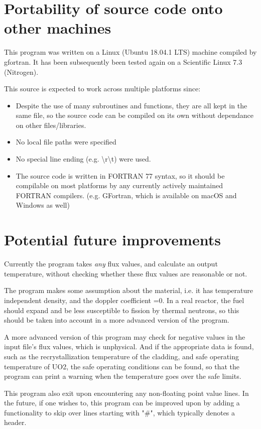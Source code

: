 \documentclass[a4paper, 12pt]{article}
\begin{document}
\section{Portability of source code onto other machines}
This program was written on a Linux (Ubuntu 18.04.1 LTS) machine compiled by gfortran. It has been subsequently been tested again on a Scientific Linux 7.3 (Nitrogen).

This source is expected to work across multiple platforms since:
\begin{itemize}
	\item Despite the use of many subroutines and functions, they are all kept in the same file, so the source code can be compiled on its own without dependance on other files/libraries.
	\item No local file paths were specified
	\item No special line ending (e.g. \textbackslash r\textbackslash t) were used.
	\item The source code is written in FORTRAN 77 syntax, so it should be compilable on most platforms by any currently actively maintained FORTRAN compilers. (e.g. GFortran, which is available on macOS and Windows as well)
\end{itemize}

\section{Potential future improvements}
Currently the program takes \emph{any} flux values, and calculate an output temperature, without checking whether these flux values are reasonable or not.

The program makes some assumption about the material, i.e. it has temperature independent density, and the doppler coefficient =0. In a real reactor, the fuel should expand and be less susceptible to fission by thermal neutrons, so this should be taken into account in a more advanced version of the program.

A more advanced version of this program may check for negative values in the input file's flux values, which is unphysical. And if the appropriate data is found, such as the recrystallization temperature of the cladding, and safe operating temperature of UO2, the safe operating conditions can be found, so that the program can print a warning when the temperature goes over the safe limits.

This program also exit upon encountering any non-floating point value lines. In the future, if one wishes to, this program can be improved upon by adding a functionality to skip over lines starting with "\#", which typically denotes a header.
\end{document}
